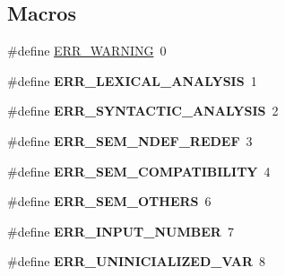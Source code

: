 \subsection*{Macros}
\begin{DoxyCompactItemize}
\item 
\#define \hyperlink{group__expression__processing_gad39ffaaf2f15904baf361c8a95eea23f}{E\+R\+R\+\_\+\+W\+A\+R\+N\+I\+NG}~0
\item 
\#define {\bfseries E\+R\+R\+\_\+\+L\+E\+X\+I\+C\+A\+L\+\_\+\+A\+N\+A\+L\+Y\+S\+IS}~1\hypertarget{group__expression__processing_gae1b0d4386e23ff5b3e5a2f2d3bb2e595}{}\label{group__expression__processing_gae1b0d4386e23ff5b3e5a2f2d3bb2e595}

\item 
\#define {\bfseries E\+R\+R\+\_\+\+S\+Y\+N\+T\+A\+C\+T\+I\+C\+\_\+\+A\+N\+A\+L\+Y\+S\+IS}~2\hypertarget{group__expression__processing_ga65bbcacac1fab0692da94892852f763f}{}\label{group__expression__processing_ga65bbcacac1fab0692da94892852f763f}

\item 
\#define {\bfseries E\+R\+R\+\_\+\+S\+E\+M\+\_\+\+N\+D\+E\+F\+\_\+\+R\+E\+D\+EF}~3\hypertarget{group__expression__processing_ga48c742e0bcd4765bff4dff57adaf4ea3}{}\label{group__expression__processing_ga48c742e0bcd4765bff4dff57adaf4ea3}

\item 
\#define {\bfseries E\+R\+R\+\_\+\+S\+E\+M\+\_\+\+C\+O\+M\+P\+A\+T\+I\+B\+I\+L\+I\+TY}~4\hypertarget{group__expression__processing_ga8f52bafe7d43e6354bae75d2caa5a3e1}{}\label{group__expression__processing_ga8f52bafe7d43e6354bae75d2caa5a3e1}

\item 
\#define {\bfseries E\+R\+R\+\_\+\+S\+E\+M\+\_\+\+O\+T\+H\+E\+RS}~6\hypertarget{group__expression__processing_ga1618901d33a81fae88c01635dc5cef54}{}\label{group__expression__processing_ga1618901d33a81fae88c01635dc5cef54}

\item 
\#define {\bfseries E\+R\+R\+\_\+\+I\+N\+P\+U\+T\+\_\+\+N\+U\+M\+B\+ER}~7\hypertarget{group__expression__processing_ga43ec102bd6ec2f2858cd4e1a4dbf6742}{}\label{group__expression__processing_ga43ec102bd6ec2f2858cd4e1a4dbf6742}

\item 
\#define {\bfseries E\+R\+R\+\_\+\+U\+N\+I\+N\+I\+C\+I\+A\+L\+I\+Z\+E\+D\+\_\+\+V\+AR}~8\hypertarget{group__expression__processing_ga28cd80ee0db6b3d64692d4b0ec19a6c4}{}\label{group__expression__processing_ga28cd80ee0db6b3d64692d4b0ec19a6c4}


\end{DoxyCompactItemize}
